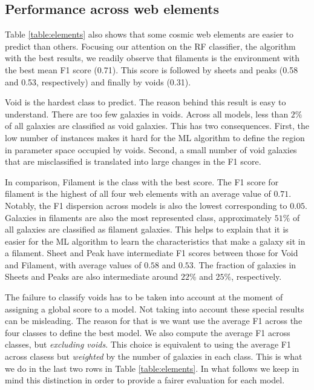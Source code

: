 \documentclass[usenatbib]{mnras}
\begin{document}
\subsection{Performance across web elements}

Table \ref{table:elements} also shows that some cosmic web elements 
are easier to predict than others.
Focusing our attention on the RF classifier, the algorithm with the
best results, we readily observe that filaments is the environment
with the best mean F1 score (0.71).
This score is followed by sheets and peaks (0.58 and 0.53,
respectively) and finally by voids (0.31).

Void is the hardest class to predict. 
The reason behind this result is easy to understand. 
There are too few galaxies in voids.
Across all models, less than $2\%$ of all galaxies
are classified as void galaxies.
This has two consequences.
First, the low number of instances makes it hard for the ML algorithm to
define the region in parameter space occupied by voids.
Second, a small number of void galaxies that are misclassified is translated into large changes in the F1 score.

In comparison, Filament is the class with the best score.
The F1 score for filament is the highest of all four
web elements with an average value of $0.71$.
Notably, the F1 dispersion across models is also the lowest corresponding to $0.05$.
Galaxies in filaments are also the most represented class,
approximately $51\%$ of all galaxies are classified as filament galaxies.
This helps to explain that it is easier for the ML algorithm to learn
the characteristics that make a galaxy sit in a filament.
Sheet and Peak have intermediate F1 scores between
those for Void and Filament, with average values of $0.58$ and $0.53$.
The fraction of galaxies in Sheets and Peaks are also intermediate around $22\%$ and $25\%$, respectively.

The failure to classify voids has to be taken into account at the
moment of assigning a global score to a model.
Not taking into account these special results can be misleading.
The reason for that is we want use the average F1 across the four classes to define the best model. 
We  also compute the average F1 across classes, but
\emph{excluding voids}.
This choice is equivalent to using the average F1 across clasess but \emph{weighted} by the number of galaxies in each class.
This is what we do in the last two rows in Table \ref{table:elements}.
In what follows we keep in mind this distinction in order to provide a fairer evaluation for each model.
\end{document}
